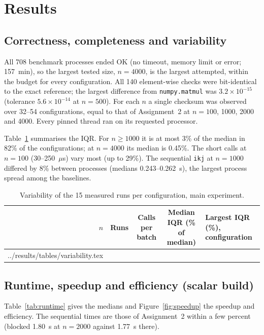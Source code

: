 \documentclass[11pt,a4paper]{article}
\makeatletter
\newcommand{\tableinput}[1]{\@@input #1 }
\makeatother
\begin{document}
\section{Results}

\subsection{Correctness, completeness and variability}

All 708 benchmark processes ended OK (no timeout, memory limit or error; 157~min), so the
largest tested size, $n = 4000$, is the largest attempted, within the budget for every
configuration. All 140 element-wise checks were bit-identical to the exact reference; the
largest difference from \texttt{numpy.matmul} was $3.2 \times 10^{-15}$ (tolerance
$5.6 \times 10^{-14}$ at $n = 500$). For each $n$ a single checksum was observed over 32--54
configurations, equal to that of Assignment~2 at $n = 100$, 1000, 2000 and 4000. Every
pinned thread ran on its requested processor.

Table~\ref{tab:variability} summarises the IQR. For $n \ge 1000$ it is at most 3\% of the
median in 82\% of the configurations; at $n = 4000$ its median is 0.45\%. The short calls
at $n = 100$ (30--250~$\mu$s) vary most (up to 29\%). The sequential \texttt{ikj} at
$n = 1000$ differed by 8\% between processes (medians 0.243--0.262~s), the largest process
spread among the baselines.

\begin{table}[H]
\centering
\small
\begin{tabular}{rccc l}
\toprule
$n$ & Runs & Calls per batch & Median IQR (\% of median) & Largest IQR (\%), configuration \\
\midrule
\tableinput{../results/tables/variability.tex}
\bottomrule
\end{tabular}
\caption{Variability of the 15 measured runs per configuration, main experiment.}
\label{tab:variability}
\end{table}

\subsection{Runtime, speedup and efficiency (scalar build)}

Table~\ref{tab:runtime} gives the medians and Figure~\ref{fig:speedup} the speedup and
efficiency. The sequential times are those of Assignment~2 within a few percent (blocked
1.80~s at $n = 2000$ against 1.77~s there).
\end{document}
